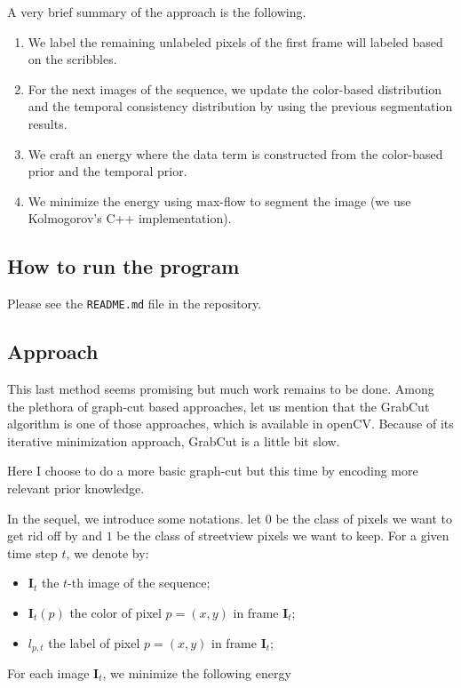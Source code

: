 \documentclass[a4paper,twoside,10pt]{article}
\begin{document}
A very brief summary of the approach is the following.
\begin{enumerate}
\item We label the remaining unlabeled pixels of the first frame will labeled based on the scribbles.
\item For the next images of the sequence, we update the color-based distribution and the temporal consistency distribution by using the previous segmentation results.
\item We craft an energy where the data term is constructed from the color-based prior and the temporal prior.
\item We minimize the energy using max-flow to segment the image (we use Kolmogorov's C++ implementation).
\end{enumerate}

\subsection{How to run the program}
Please see the \texttt{README.md} file in the repository.


\subsection{Approach}

This last method seems promising but much work remains to be done. Among the plethora of graph-cut based approaches, let us mention that the GrabCut algorithm is one of those approaches, which is available in openCV. Because of its iterative minimization approach, GrabCut is a little bit slow.

Here I choose to do a more basic graph-cut but this time by encoding more relevant prior knowledge.

In the sequel, we introduce some notations. let $0$ be the class of pixels we want to get rid off by and $1$ be the class of streetview pixels we want to keep. For a given time step $t$, we denote by:
\begin{itemize}
\item $\mathbf{I}_t$ the $t$-th image of the sequence;
\item $\mathbf{I}_t(p)$ the color of pixel $p=(x,y)$ in frame $\mathbf{I}_t$;
\item $l_{p,t}$ the label of pixel $p=(x,y)$ in frame $\mathbf{I}_t$;
\end{itemize}

For each image $\mathbf{I}_t$, we minimize the following energy
\end{document}
